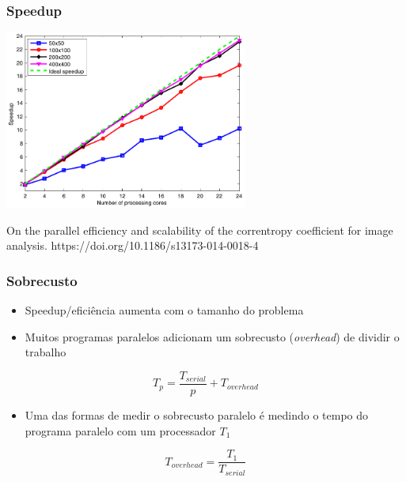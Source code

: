 \documentclass[xcolor={usenames,dvipsnames},12pt,presentation,aspectratio=169]{beamer}
\begin{document}
\begin{frame}[fragile]
  \frametitle{Speedup}
  \vspace{-3mm}
   \begin{center}
 	\includegraphics[width=0.6\textwidth]{artigo1.png}
   \end{center}
   \vspace{-5mm}
   {\tiny On the parallel efficiency and scalability of the correntropy coefficient for image analysis. 
   https://doi.org/10.1186/s13173-014-0018-4}
\end{frame}
\begin{frame}[fragile]
  \frametitle{Sobrecusto}
\begin{itemize}
  \item Speedup/eficiência aumenta com o tamanho do problema
  \item Muitos programas paralelos adicionam um sobrecusto (\emph{overhead}) de dividir o trabalho
\end{itemize}
  \begin{equation*}
    T_p = \frac{T_{serial}}{p} + T_{overhead}
  \end{equation*}
\begin{itemize}
  \item Uma das formas de medir o sobrecusto paralelo é medindo o tempo do
    programa paralelo com um processador $T_1$
\end{itemize}
  \begin{equation*}
    T_{overhead} = \frac{T_{1}}{T_{serial}}
  \end{equation*}
\end{frame}
\end{document}
